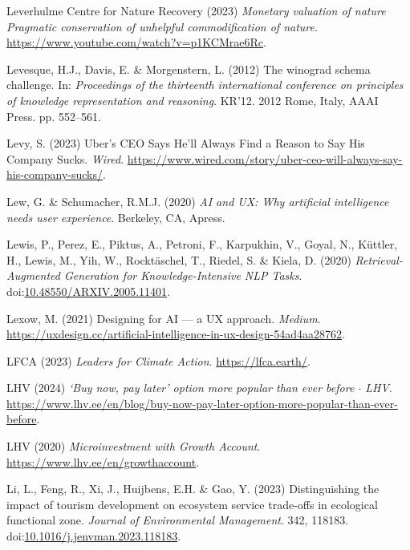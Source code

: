 \documentclass[
  letterpaper,
  DIV=11,
  numbers=noendperiod]{scrartcl}
\newlength{\cslhangindent}
\newenvironment{CSLReferences}[2] %
 {\begin{list}{}{%
  \setlength{\itemindent}{0pt}
  \setlength{\leftmargin}{0pt}
  \setlength{\parsep}{0pt}
  \ifodd #1
   \setlength{\leftmargin}{\cslhangindent}
   \setlength{\itemindent}{-1\cslhangindent}
  \fi
  \setlength{\itemsep}{#2\baselineskip}}}
 {\end{list}}
\begin{document}
\begin{CSLReferences}{0}{1}
Leverhulme Centre for Nature Recovery (2023) \emph{Monetary valuation of
nature {Pragmatic} conservation of unhelpful commodification of nature}.
\url{https://www.youtube.com/watch?v=p1KCMrae6Rc}.

Levesque, H.J., Davis, E. \& Morgenstern, L. (2012) The winograd schema
challenge. In: \emph{Proceedings of the thirteenth international
conference on principles of knowledge representation and reasoning}.
{KR}'12. 2012 Rome, Italy, AAAI Press. pp. 552--561.

Levy, S. (2023) Uber's {CEO Says He}'ll {Always Find} a {Reason} to {Say
His Company Sucks}. \emph{Wired}.
\url{https://www.wired.com/story/uber-ceo-will-always-say-his-company-sucks/}.

Lew, G. \& Schumacher, R.M.J. (2020) \emph{{AI} and {UX}: Why artificial
intelligence needs user experience}. Berkeley, CA, Apress.

Lewis, P., Perez, E., Piktus, A., Petroni, F., Karpukhin, V., Goyal, N.,
Küttler, H., Lewis, M., Yih, W., Rocktäschel, T., Riedel, S. \& Kiela,
D. (2020) \emph{Retrieval-{Augmented Generation} for
{Knowledge-Intensive NLP Tasks}}.
doi:\href{https://doi.org/10.48550/ARXIV.2005.11401}{10.48550/ARXIV.2005.11401}.

Lexow, M. (2021) Designing for {AI} --- a {UX} approach. \emph{Medium}.
\url{https://uxdesign.cc/artificial-intelligence-in-ux-design-54ad4aa28762}.

LFCA (2023) \emph{Leaders for {Climate Action}}.
\url{https://lfca.earth/}.

LHV (2024) \emph{{`{Buy} now, pay later'} option more popular than ever
before {\(\cdot\)} {LHV}}.
\url{https://www.lhv.ee/en/blog/buy-now-pay-later-option-more-popular-than-ever-before}.

LHV (2020) \emph{Microinvestment with {Growth Account}}.
\url{https://www.lhv.ee/en/growthaccount}.

Li, L., Feng, R., Xi, J., Huijbens, E.H. \& Gao, Y. (2023)
Distinguishing the impact of tourism development on ecosystem service
trade-offs in ecological functional zone. \emph{Journal of Environmental
Management}. 342, 118183.
doi:\href{https://doi.org/10.1016/j.jenvman.2023.118183}{10.1016/j.jenvman.2023.118183}.


\end{CSLReferences}
\end{document}
